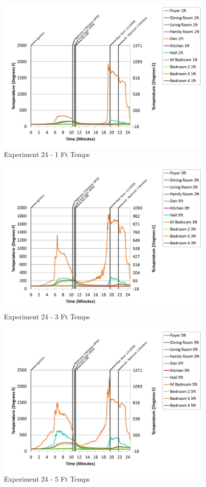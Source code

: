 \documentclass{article}
\begin{document}
\begin{appendices}
	\begin{figure}[h!]
		\centering
		\includegraphics[height=3.05in]{0_Images/Results_Charts/Exp_24_Charts/1FtTemps.pdf}
		\caption{Experiment 24 - 1 Ft Temps}
	\end{figure}
 

	\begin{figure}[h!]
		\centering
		\includegraphics[height=3.05in]{0_Images/Results_Charts/Exp_24_Charts/3FtTemps.pdf}
		\caption{Experiment 24 - 3 Ft Temps}
	\end{figure}
 
	\clearpage

	\begin{figure}[h!]
		\centering
		\includegraphics[height=3.05in]{0_Images/Results_Charts/Exp_24_Charts/5FtTemps.pdf}
		\caption{Experiment 24 - 5 Ft Temps}
	\end{figure}
 


\end{appendices}
\end{document}
